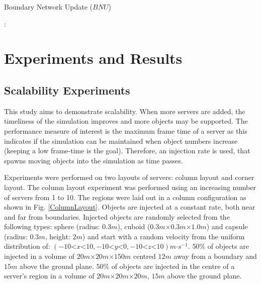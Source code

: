 \begin{algorithm}
	\caption{Boundary Network Update ($BNU$)}\label{boundaryNetworkAlgorithm}
	\begin{algorithmic}[1]
		\State {}
		\State {}
		\State
		 :
		\State {}
		\State {}
		\State {}
		\State {}
		\EndFor
		\EndProcedure
	\end{algorithmic}
\end{algorithm}

\chapter{Experiments and Results}
\section{Scalability Experiments}
This study aims to demonstrate scalability. When more servers are added, the timeliness of the simulation improves and more objects may be supported. The performance measure of interest is the maximum frame time of a server as this indicates if the simulation can be maintained when object numbers increase (keeping a low frame-time is the goal). Therefore, an injection rate is used, that spawns moving objects into the simulation as time passes.

Experiments were performed on two layouts of servers: column layout and corner layout. The column layout experiment was performed using an increasing number of servers from 1 to 10. The regions were laid out in a column configuration as shown in Fig. \ref{ColumnLayout}. Objects are injected at a constant rate, both near and far from boundaries. Injected objects are randomly selected from the following types: sphere (radius: $0.3m$), cuboid ($0.3m\mathord{\times}0.3m\mathord{\times}1.0m$) and capsule (radius: $0.3m$, height: $2m$) and start with a random velocity from the uniform distribution of: $(-10\mathord{<}x\mathord{<}10,-10\mathord{<}y\mathord{<}0,-10\mathord{<}z\mathord{<}10)m\mathord{\cdot}s^{-1}$. $50\%$ of objects are injected in a volume of $20m\mathord{\times}20m\mathord{\times}150m$ centred $12m$ away from a boundary and $15m$ above the ground plane. $50\%$ of objects are injected in the centre of a server's region in a volume of $20m\mathord{\times}20m\mathord{\times}20m$, $15m$ above the ground plane.

